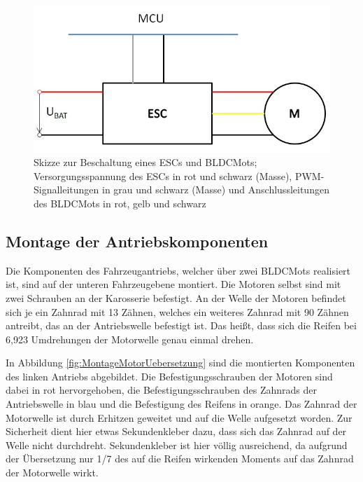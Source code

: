 \begin{figure}[H] %
\includegraphics[width=.90\textwidth]{sec4/images/Skizze_BLDC_ESC} 
\centering
\captionsetup{width=.95\textwidth}
\caption[Skizze zur Beschaltung eines \ac{ESC}s und \ac{BLDCMot}s]{Skizze zur Beschaltung eines \ac{ESC}s und \ac{BLDCMot}s; Versorgungsspannung des \ac{ESC}s in rot und schwarz (Masse), \ac{PWM}-Signalleitungen in grau und schwarz (Masse) und Anschlussleitungen des \ac{BLDCMot}s in rot, gelb und schwarz}\centering
\label{fig:SkizzeAntrieb}
\end{figure}

\subsection{Montage der Antriebskomponenten}\label{Sec4Sub2}

Die Komponenten des Fahrzeugantriebs, welcher über zwei \acp{BLDCMot} realisiert ist, sind auf der unteren Fahrzeugebene montiert. Die Motoren selbst sind mit zwei Schrauben an der Karosserie befestigt. An der Welle der Motoren befindet sich je ein Zahnrad mit 13 Zähnen, welches ein weiteres Zahnrad mit 90 Zähnen antreibt, das an der Antriebswelle befestigt ist. Das heißt, dass sich die Reifen bei 6,923 Umdrehungen der Motorwelle genau einmal drehen.\vspace{11pt}

In Abbildung \ref{fig:MontageMotorUebersetzung} sind die montierten Komponenten des linken Antriebs abgebildet. Die Befestigungsschrauben der Motoren sind dabei in rot hervorgehoben, die Befestigungsschrauben des Zahnrads der Antriebswelle in blau und die Befestigung des Reifens in orange. Das Zahnrad der Motorwelle ist durch Erhitzen geweitet und auf die Welle aufgesetzt worden. Zur Sicherheit dient hier etwas Sekundenkleber dazu, dass sich das Zahnrad auf der Welle nicht durchdreht. Sekundenkleber ist hier völlig ausreichend, da aufgrund der Übersetzung nur 1/7 des auf die Reifen wirkenden Moments auf das Zahnrad der Motorwelle wirkt.

